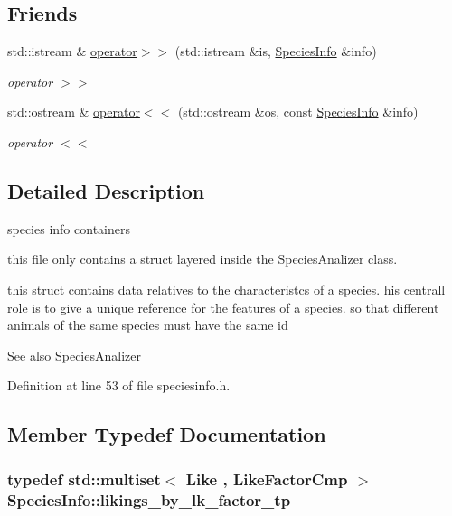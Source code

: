 \subsection*{Friends}
\begin{DoxyCompactItemize}
\item 
std::istream \& \hyperlink{structSpeciesInfo_a1c3911af6003b03265b6fa64aa001d8a}{operator$>$$>$} (std::istream \&is, \hyperlink{structSpeciesInfo}{SpeciesInfo} \&info)
\begin{DoxyCompactList}\small\item\em operator $>$$>$ \end{DoxyCompactList}\item 
std::ostream \& \hyperlink{structSpeciesInfo_ab706957c8295cec747ca66b56fc1b4d7}{operator$<$$<$} (std::ostream \&os, const \hyperlink{structSpeciesInfo}{SpeciesInfo} \&info)
\begin{DoxyCompactList}\small\item\em operator $<$$<$ \end{DoxyCompactList}\end{DoxyCompactItemize}


\subsection{Detailed Description}
species info containers 

this file only contains a struct layered inside the SpeciesAnalizer class.

this struct contains data relatives to the characteristcs of a species. his centrall role is to give a unique reference for the features of a species. so that different animals of the same species must have the same id \begin{DoxySeeAlso}{See also}
SpeciesAnalizer 
\end{DoxySeeAlso}


Definition at line 53 of file speciesinfo.h.



\subsection{Member Typedef Documentation}
\hypertarget{structSpeciesInfo_aab6fabec09f9eb5a26e680d1d6f9d037}{
\subsubsection[{likings\_\-by\_\-lk\_\-factor\_\-tp}]{\setlength{\rightskip}{0pt plus 5cm}typedef std::multiset$<$ {\bf Like} , {\bf LikeFactorCmp} $>$ {\bf SpeciesInfo::likings\_\-by\_\-lk\_\-factor\_\-tp}}}
\label{structSpeciesInfo_aab6fabec09f9eb5a26e680d1d6f9d037}


